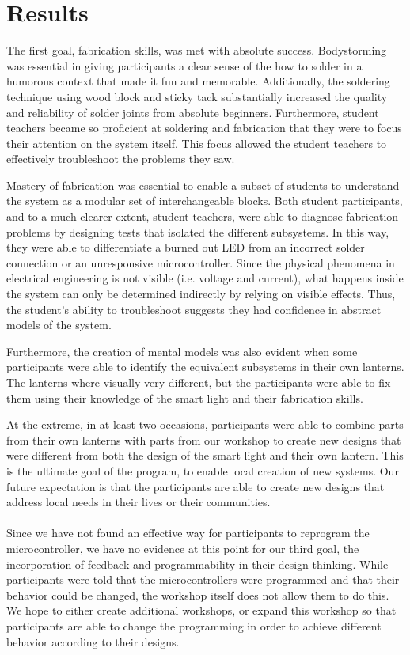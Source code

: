 \documentclass[11pt, twocolumn]{article}
\begin{document}
\section*{Results}
The first goal, fabrication skills, was met with absolute success. Bodystorming was essential in giving participants a clear sense of the how to solder in a humorous context that made it fun and memorable. Additionally, the soldering technique using wood block and sticky tack substantially increased the quality and reliability of solder joints from absolute beginners. Furthermore, student teachers became so proficient at soldering and fabrication that they were to focus their attention on the system itself. This focus allowed the student teachers to effectively troubleshoot the problems they saw.

Mastery of fabrication was essential to enable a subset of students to understand the system as a modular set of interchangeable blocks. Both student participants, and to a much clearer extent, student teachers, were able to diagnose fabrication problems by designing tests that isolated the different subsystems. In this way, they were able to differentiate a burned out LED from an incorrect solder connection or an unresponsive microcontroller. Since the physical phenomena in electrical engineering is not visible (i.e. voltage and current), what happens inside the system can only be determined indirectly by relying on visible effects. Thus, the student's ability to troubleshoot suggests they had confidence in abstract models of the system.

Furthermore, the creation of mental models was also evident when some participants were able to identify the equivalent subsystems in their own lanterns. The lanterns where visually very different, but the participants were able to fix them using their knowledge of the smart light and their fabrication skills.

At the extreme, in at least two occasions, participants were able to combine parts from their own lanterns with parts from our workshop to create new designs that were different from both the design of the smart light and their own lantern. This is the ultimate goal of the program, to enable local creation of new systems. Our future expectation is that the participants are able to create new designs that address local needs in their lives or their communities.\ \\
\ \\
Since we have not found an effective way for participants to reprogram the microcontroller, we have no evidence at this point for our third goal, the incorporation of feedback and programmability in their design thinking. While participants were told that the microcontrollers were programmed and that their behavior could be changed, the workshop itself does not allow them to do this. We hope to either create additional workshops, or expand this workshop so that participants are able to change the programming in order to achieve different behavior according to their designs.
\end{document}
